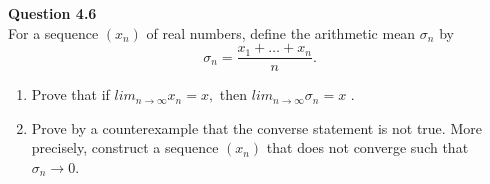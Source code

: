 \documentclass[12pt]{article}
\begin{document}
\textbf{Question 4.6}\\
For a sequence $(x_n)$ of real numbers, define the arithmetic mean $\sigma_n$ by 
$$\sigma_n = \frac{x_1+\ldots + x_n}{n}.
$$
\begin{enumerate}[label=(\roman*)]
    \item Prove that if $lim_{n\rightarrow \infty} x_n = x,$ then $lim_{n\rightarrow \infty} \sigma_n = x$ .
    \item Prove by a counterexample that the converse statement is not true. More precisely, construct a sequence $(x_n)$ that does not converge such that $\sigma_n \rightarrow 0$.
\end{enumerate}
\end{document}
